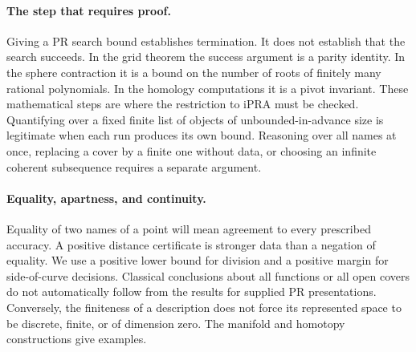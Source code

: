 \paragraph{The step that requires proof.}
Giving a PR search bound establishes termination. It does not establish that the search succeeds. In the grid theorem the success argument is a parity identity. In the sphere contraction it is a bound on the number of roots of finitely many rational polynomials. In the homology computations it is a pivot invariant. These mathematical steps are where the restriction to iPRA must be checked. Quantifying over a fixed finite list of objects of unbounded-in-advance size is legitimate when each run produces its own bound. Reasoning over all names at once, replacing a cover by a finite one without data, or choosing an infinite coherent subsequence requires a separate argument.

\paragraph{Equality, apartness, and continuity.}
Equality of two names of a point will mean agreement to every prescribed accuracy. A positive distance certificate is stronger data than a negation of equality. We use a positive lower bound for division and a positive margin for side-of-curve decisions. Classical conclusions about all functions or all open covers do not automatically follow from the results for supplied PR presentations. Conversely, the finiteness of a description does not force its represented space to be discrete, finite, or of dimension zero. The manifold and homotopy constructions give examples.
